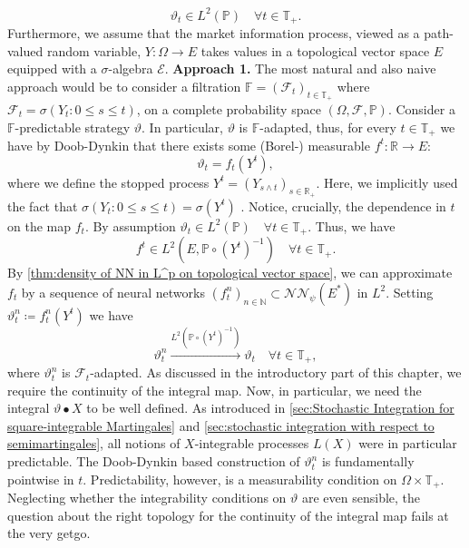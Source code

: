 \documentclass[11pt,a4paper,twoside,openany]{report}
\theoremstyle{plain} %
\theoremstyle{definition} %
\theoremstyle{remark} %
\let\parencite\authnumparencite
\begin{document}
\begin{equation}
      \vartheta_t\in L^2(\mathbb{P})\quad\forall t\in\mathbb{T}_+.
\end{equation}
Furthermore, we assume that the market information process, viewed as a path-valued random variable, \(Y:\Omega\to E\) takes values in a topological vector space \(E\) equipped with a \(\sigma\)-algebra \(\mathcal{E}\). 
\bigbreak
\textbf{Approach 1.}
The most natural and also naive approach would be to consider a filtration \(\mathbb{F}=(\mathcal{F}_t)_{t\in\mathbb{T}_+}\) where \(\mathcal{F}_t=\sigma(Y_t:0\leq s\leq t )\), on a complete probability space \((\Omega,\mathcal{F},\mathbb{P})\).  Consider a \(\mathbb{F}\)-predictable strategy \(\vartheta\). In particular, \(\vartheta\) is \(\mathbb{F}\)-adapted, thus, for every \(t\in\mathbb{T}_+\) we have by Doob-Dynkin that there exists some (Borel-) measurable \(f^t:\mathbb{R}\to E\):
\begin{equation}
    \vartheta_t=f_t(Y^t),
\end{equation}
where we define the stopped process \(Y^t=(Y_{s\wedge t})_{s\in\mathbb{R}_+}\). Here, we implicitly used the fact that \(\sigma(Y_t:0\leq s\leq t)=\sigma(Y^t)\) \parencite[Problem~4.2.]{KaratzasShreve1991Brownian}. Notice, crucially, the dependence in \(t\) on the map \(f_t\). By assumption 
\(
    \vartheta_t\in L^2(\mathbb{P})\quad\forall t\in\mathbb{T}_+
\).
Thus, we have
\begin{equation}
    f^t\in L^2(E,\mathbb{P}\circ(Y^t)^{-1})\quad\forall t\in\mathbb{T}_+.
\end{equation}
By \cref{thm:density of NN in L^p on topological vector space}, we can approximate \(f_t\) by a sequence of neural networks \((f_t^n)_{n\in\mathbb{N}}\subset\mathcal{NN}_\psi(E^*)\) in \(L^2\). Setting \(\vartheta^n_t\coloneqq f^n_t(Y^t)\) we have
\begin{equation}
    \vartheta_t^n\overset{L^2(\mathbb{P}\circ(Y^t)^{-1})}{\to}\vartheta_t\quad\forall t\in\mathbb{T}_+,
\end{equation}
where \(\vartheta_t^n\) is \(\mathcal{F}_t\)-adapted.
As discussed in the introductory part of this chapter, we require the continuity of the integral map. Now, in particular, we need the integral \(\vartheta\bullet X\) to be well defined. As introduced in \cref{sec:Stochastic Integration for square-integrable Martingales} and \cref{sec:stochastic integration with respect to semimartingales}, all notions of \(X\)-integrable processes \(L(X)\) were in particular predictable. The Doob-Dynkin based construction of \(\vartheta_t^n\) is fundamentally pointwise in \(t\). Predictability, however, is a measurability condition on \(\Omega\times\mathbb{T}_+\). Neglecting whether the integrability conditions on \(\vartheta\) are even sensible, the question about the right topology for the continuity of the integral map fails at the very getgo. \\\\
\end{document}
